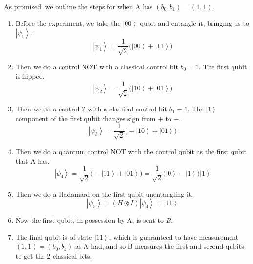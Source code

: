\documentclass{article}
\newcommand{\ket}[1]{\ensuremath{\left|#1\right\rangle}}
\begin{document}
    \begin{example}
      As promised, we outline the steps for when A has $(b_0, b_1) = (1, 1)$.
      \begin{enumerate} 
        \item Before the experiment, we take the $\ket{00}$ qubit and entangle it, bringing us to $\ket{\psi_1}$. 
          \begin{equation} 
            \ket{\psi_1} = \frac{1}{\sqrt{2}} \big( \ket{00} + \ket{11} \big)
          \end{equation}
        \item Then we do a control NOT with a classical control bit $b_0 = 1$. The first qubit is flipped. 
          \begin{equation} 
            \ket{\psi_2} = \frac{1}{\sqrt{2}} \big( \ket{10} + \ket{01} \big)
          \end{equation}
        \item Then we do a control Z with a classical control bit $b_1 = 1$. The $\ket{1}$ component of the first qubit changes sign from $+$ to $-$. 
          \begin{equation} 
            \ket{\psi_3} = \frac{1}{\sqrt{2}} \big( - \ket{10} + \ket{01} \big)
          \end{equation}
        \item Then we do a quantum control NOT with the control qubit as the first qubit that A has. 
          \begin{equation} 
            \ket{\psi_4} = \frac{1}{\sqrt{2}} \big( -\ket{11} + \ket{01} \big) = \frac{1}{\sqrt{2}} \big( \ket{0} - \ket{1} \big) \ket{1}
          \end{equation}
        \item Then we do a Hadamard on the first qubit unentangling it. 
          \begin{equation} 
            \ket{\psi_5} = (H \otimes I) \ket{\psi_4} = \ket{11}
          \end{equation}
        \item Now the first qubit, in possession by A, is sent to $B$. 
        \item The final qubit is of state $\ket{11}$, which is guaranteed to have measurement $(1, 1) = (b_0, b_1)$ as A had, and so B measures the first and second qubits to get the 2 classical bits. 
      \end{enumerate}
    \end{example}
\end{document}
